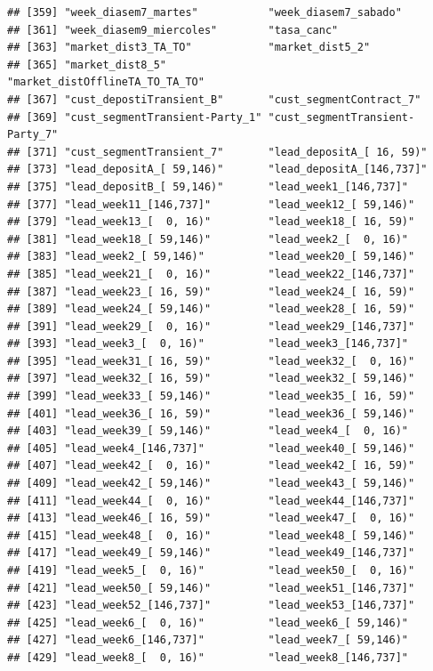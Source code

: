 \documentclass[
]{article}
\begin{document}
\begin{verbatim}
## [359] "week_diasem7_martes"           "week_diasem7_sabado"          
## [361] "week_diasem9_miercoles"        "tasa_canc"                    
## [363] "market_dist3_TA_TO"            "market_dist5_2"               
## [365] "market_dist8_5"                "market_distOfflineTA_TO_TA_TO"
## [367] "cust_depostiTransient_B"       "cust_segmentContract_7"       
## [369] "cust_segmentTransient-Party_1" "cust_segmentTransient-Party_7"
## [371] "cust_segmentTransient_7"       "lead_depositA_[ 16, 59)"      
## [373] "lead_depositA_[ 59,146)"       "lead_depositA_[146,737]"      
## [375] "lead_depositB_[ 59,146)"       "lead_week1_[146,737]"         
## [377] "lead_week11_[146,737]"         "lead_week12_[ 59,146)"        
## [379] "lead_week13_[  0, 16)"         "lead_week18_[ 16, 59)"        
## [381] "lead_week18_[ 59,146)"         "lead_week2_[  0, 16)"         
## [383] "lead_week2_[ 59,146)"          "lead_week20_[ 59,146)"        
## [385] "lead_week21_[  0, 16)"         "lead_week22_[146,737]"        
## [387] "lead_week23_[ 16, 59)"         "lead_week24_[ 16, 59)"        
## [389] "lead_week24_[ 59,146)"         "lead_week28_[ 16, 59)"        
## [391] "lead_week29_[  0, 16)"         "lead_week29_[146,737]"        
## [393] "lead_week3_[  0, 16)"          "lead_week3_[146,737]"         
## [395] "lead_week31_[ 16, 59)"         "lead_week32_[  0, 16)"        
## [397] "lead_week32_[ 16, 59)"         "lead_week32_[ 59,146)"        
## [399] "lead_week33_[ 59,146)"         "lead_week35_[ 16, 59)"        
## [401] "lead_week36_[ 16, 59)"         "lead_week36_[ 59,146)"        
## [403] "lead_week39_[ 59,146)"         "lead_week4_[  0, 16)"         
## [405] "lead_week4_[146,737]"          "lead_week40_[ 59,146)"        
## [407] "lead_week42_[  0, 16)"         "lead_week42_[ 16, 59)"        
## [409] "lead_week42_[ 59,146)"         "lead_week43_[ 59,146)"        
## [411] "lead_week44_[  0, 16)"         "lead_week44_[146,737]"        
## [413] "lead_week46_[ 16, 59)"         "lead_week47_[  0, 16)"        
## [415] "lead_week48_[  0, 16)"         "lead_week48_[ 59,146)"        
## [417] "lead_week49_[ 59,146)"         "lead_week49_[146,737]"        
## [419] "lead_week5_[  0, 16)"          "lead_week50_[  0, 16)"        
## [421] "lead_week50_[ 59,146)"         "lead_week51_[146,737]"        
## [423] "lead_week52_[146,737]"         "lead_week53_[146,737]"        
## [425] "lead_week6_[  0, 16)"          "lead_week6_[ 59,146)"         
## [427] "lead_week6_[146,737]"          "lead_week7_[ 59,146)"         
## [429] "lead_week8_[  0, 16)"          "lead_week8_[146,737]"         

\end{verbatim}
\end{document}

